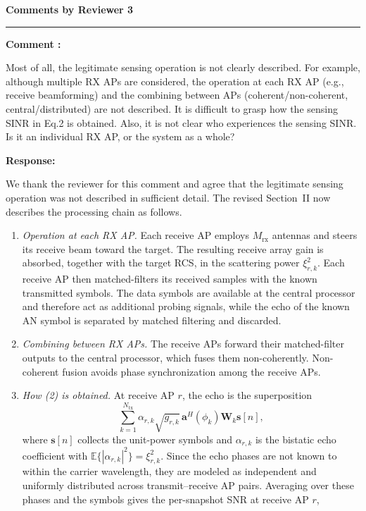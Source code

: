 \documentclass[a4paper,12pt]{article}
\newcounter{reviewcomment}
\newcommand{\reviewer}[1]{%
  \clearpage
  \setcounter{reviewcomment}{0}%
  {\color{blue}\large\bfseries Comments by #1\par}
  {\color{blue}\rule{\linewidth}{0.15em}}\par
}
\newenvironment{reviewcomment}{%
  \stepcounter{reviewcomment}%
  \begin{shaded}
  \textbf{Comment \thereviewcomment:}\par
}{\end{shaded}}
\newenvironment{response}{\par\textbf{Response:}\par}{\par}
\begin{document}
\reviewer{Reviewer 3}
\begin{reviewcomment}
Most of all, the legitimate sensing operation is not clearly described. For
example, although multiple RX APs are considered, the operation at each RX AP
(e.g., receive beamforming) and the combining between APs
(coherent/non-coherent, central/distributed) are not described. It is
difficult to grasp how the sensing SINR in Eq.2 is obtained. Also, it is not
clear who experiences the sensing SINR. Is it an individual RX AP, or the
system as a whole?
\end{reviewcomment}
\begin{response}
We thank the reviewer for this comment and agree that the legitimate sensing
operation was not described in sufficient detail. The revised Section~II now
describes the processing chain as follows.
\begin{enumerate}
  \item \emph{Operation at each RX AP.} Each receive AP employs
  $M_{\mathrm{rx}}$ antennas and steers its receive beam toward the target.
  The resulting receive array gain is absorbed, together with the target
  RCS, in the scattering power $\xi_{r,k}^2$. Each receive AP then
  matched-filters its received samples with the known transmitted symbols.
  The data symbols are available at the central processor and therefore act
  as additional probing signals, while the echo of the known AN symbol is
  separated by matched filtering and discarded.
  \item \emph{Combining between RX APs.} The receive APs forward their
  matched-filter outputs to the central processor, which fuses them
  non-coherently. Non-coherent fusion avoids phase synchronization among the
  receive APs.
  \item \emph{How (2) is obtained.} At receive AP $r$, the echo is the
  superposition
  \begin{equation*}
  \sum_{k=1}^{N_{\mathrm{tx}}}\alpha_{r,k}\sqrt{g_{r,k}}\,\mathbf{a}^H(\phi_k)\mathbf{W}_k\mathbf{s}[n],
  \end{equation*}
  where $\mathbf{s}[n]$ collects the unit-power symbols and $\alpha_{r,k}$ is
  the bistatic echo coefficient with $\mathbb{E}\{|\alpha_{r,k}|^2\}=\xi_{r,k}^2$.
  Since the echo phases are not known to within the carrier wavelength, they
  are modeled as independent and uniformly distributed across
  transmit--receive AP pairs. Averaging over these phases and the symbols
  gives the per-snapshot SNR at receive AP $r$,
  \begin{equation*}

\end{equation*}
\end{enumerate}
\end{response}
\end{document}

